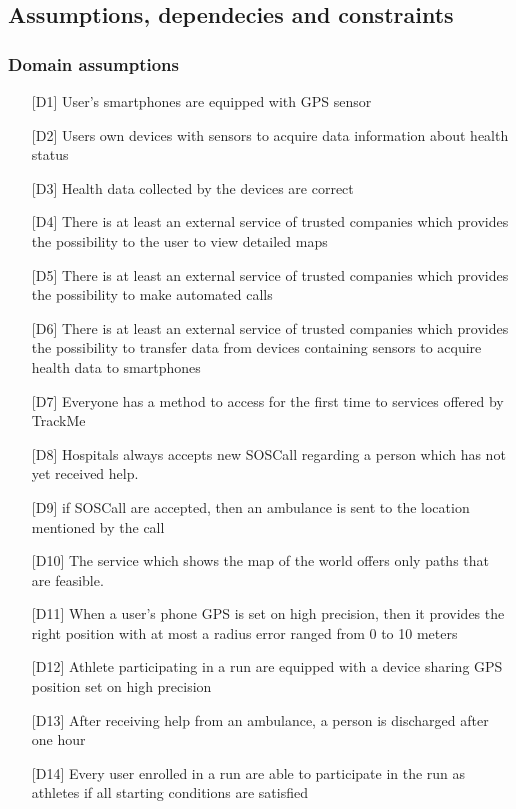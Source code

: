 \subsection{Assumptions, dependecies and constraints}

\subsubsection{Domain assumptions}
\begin{itemize}
\item[{[D1]}]  User's smartphones are equipped with GPS sensor
\item[{[D2]}] Users own devices with sensors to acquire data information about health status
\item[{[D3]}] Health data collected by the devices are correct
\item[{[D4]}] There is at least an external service of trusted companies which provides the possibility to the user to view detailed maps
\item[{[D5]}] There is at least an external service of trusted companies which provides the possibility to make automated calls
\item[{[D6]}] There is at least an external service of trusted companies which provides the possibility to transfer data from devices containing sensors to acquire health data to smartphones
\item[{[D7]}] Everyone has a method to access for the first time to services offered by TrackMe
\item[{[D8]}] Hospitals always accepts new SOSCall regarding a person which has not yet received help.
\item[{[D9]}] if SOSCall are accepted, then an ambulance is sent to the location mentioned by the call
\item[{[D10]}] The service which shows the map of the world offers only paths that are feasible.
\item[{[D11]}] When a user's phone GPS is set on high precision, then it provides the right position with at most a radius error ranged from 0 to 10 meters
\item[{[D12]}] Athlete participating in a run are equipped with a device sharing GPS position set on high precision
\item[{[D13]}] After receiving help from an ambulance, a person is discharged after one hour
\item[{[D14]}] Every user enrolled in a run are able to participate in the run as athletes if all starting conditions are satisfied
\end{itemize}
